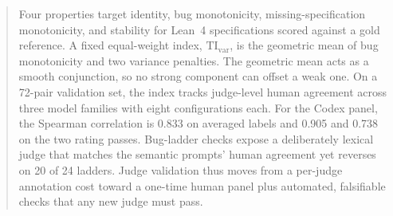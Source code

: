\begin{abstract}
Four properties target identity, bug monotonicity, missing-specification monotonicity, and stability for Lean~4 specifications scored against a gold reference.
A fixed equal-weight index, $\mathrm{TI}_{\mathrm{var}}$, is the geometric mean of bug monotonicity and two variance penalties.
The geometric mean acts as a smooth conjunction, so no strong component can offset a weak one.
On a 72-pair validation set, the index tracks judge-level human agreement across three model families with eight configurations each.
For the Codex panel, the Spearman correlation is 0.833 on averaged labels and 0.905 and 0.738 on the two rating passes.
Bug-ladder checks expose a deliberately lexical judge that matches the semantic prompts' human agreement yet reverses on 20 of 24 ladders.
Judge validation thus moves from a per-judge annotation cost toward a one-time human panel plus automated, falsifiable checks that any new judge must pass.
\end{abstract}
